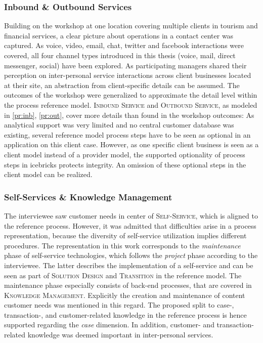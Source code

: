 		\subsubsection{Inbound \& Outbound Services}
	Building on the workshop at one location covering multiple clients in tourism and financial services, a clear picture about operations in a contact center was captured. 
	As voice, video, email, chat, twitter and facebook interactions were covered, all four channel types introduced in this thesis (voice, mail, direct messenger, social) have been explored. As participating managers shared their perception on inter-personal service interactions across client businesses located at their site, an abstraction from client-specific details can be assumed. The outcomes of the workshop were generalized to approximate the detail level within the process reference model. \textsc{Inbound Service} and \textsc{Outbound Service}, as modeled in \ref{pr:inb}, \ref{pr:out}, cover more details than found in the workshop outcomes: As analytical support was very limited and no central customer database was existing, several reference model process steps have to be seen as optional in an application on this client case. However, as one specific client business is seen as a client model instead of a provider model, the supported optionality of process steps in icebricks protects integrity. An omission of these optional steps in the client model can be realized.
	
	\subsubsection{Self-Services \& Knowledge Management}
	The interviewee saw customer needs in center of \textsc{Self-Service}, which is aligned to the reference process. However, it was admitted that difficulties arise in a process representation, because the diversity of self-service utilization implies different procedures. The representation in this work corresponds to the \textit{maintenance} phase of self-service technologies, which follows the \textit{project} phase according to the interviewee. The latter describes the implementation of a self-service and can be seen as part of \textsc{Solution Design} and \textsc{Transition} in the reference model. The maintenance phase especially consists of back-end processes, that are covered in \textsc{Knowledge Management}. Explicitly the creation and maintenance of content \wrt customer needs was mentioned in this regard. The proposed split to case-, transaction-, and customer-related knowledge  in the reference process is hence supported regarding the \textit{case} dimension. In addition, customer- and transaction-related knowledge was deemed important in inter-personal services. 
	
